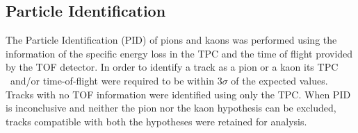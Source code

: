 \begin{table}[bth]
\caption{\Dzero\ cuts for \pp\ collisions at $\s=5.02$~TeV. Cuts 4}
\label{DZeroCutsppC4}
\end{table}


\subsection{Particle Identification}

The Particle Identification (PID) of pions and kaons was performed using the information of the specific energy loss 
in the TPC and the time of flight provided by the TOF detector. 
In order to identify a track as a pion or a kaon its TPC \dedx\ and/or time-of-flight were required to be within 3$\sigma$ of the expected values. 
Tracks with no TOF information were identified using only the TPC.
When PID is inconclusive and neither the pion nor the kaon hypothesis can be excluded, tracks compatible with both the hypotheses 
were retained for analysis.

